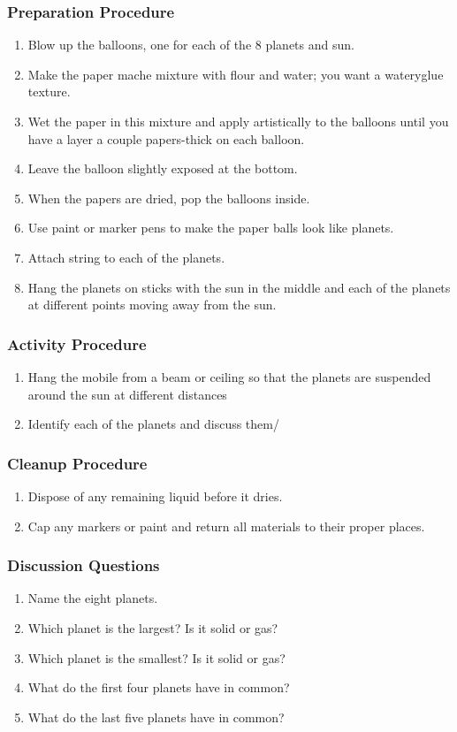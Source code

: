 \subsubsection*{Preparation Procedure}
\begin{enumerate}
\item{Blow up the balloons, one for each of the 8 planets and sun.}
\item{Make the paper mache mixture with flour and water; you want a wateryglue texture.}
\item{Wet the paper in this mixture and apply artistically to the balloons until you have a layer a couple papers-thick on each balloon.}
\item{Leave the balloon slightly exposed at the bottom.}
\item{When the papers are dried, pop the balloons inside.}
\item{Use paint or marker pens to make the paper balls look like planets.}
\item{Attach string to each of the planets.}
\item{Hang the planets on sticks with the sun in the middle and each of the planets at different points moving away from the sun.}
\end{enumerate}

\subsubsection*{Activity Procedure}
\begin{enumerate}
\item{Hang the mobile from a beam or ceiling so that the planets are suspended around the sun at different distances}
\item{Identify each of the planets and discuss them/}
\end{enumerate}

\subsubsection*{Cleanup Procedure}
\begin{enumerate}
\item{Dispose of any remaining liquid before it dries.}
\item{Cap any markers or paint and return all materials to their proper places.}
\end{enumerate}

\subsubsection*{Discussion Questions}
\begin{enumerate}
\item{Name the eight planets.}
\item{Which planet is the largest?  Is it solid or gas?}
\item{Which planet is the smallest?  Is it solid or gas?}
\item{What do the first four planets have in common?}
\item{What do the last five planets have in common?}
\end{enumerate}

